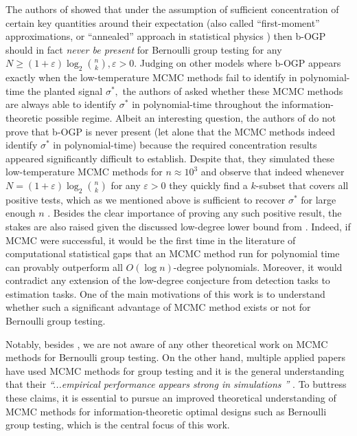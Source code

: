 \documentclass[12pt,reqno]{amsart}
\numberwithin{equation}{section}
\theoremstyle{definition}
\renewcommand{\epsilon}{\varepsilon}
\renewcommand{\[}{\begin{equation}}
\renewcommand{\]}{\end{equation}}
\renewcommand{\|}{\bigg{|}}
\begin{document}
The authors of \cite{iliopoulos2021group} showed that under the assumption of sufficient concentration of certain key quantities around their expectation (also called ``first-moment'' approximations, or ``annealed'' approach in statistical physics \cite{zdeborova2016statistical}) then b-OGP should in fact \emph{never be present} for Bernoulli group testing for any $N \geq (1+\epsilon)\log_2 \binom{n}{k}, \epsilon>0$. Judging on other models where b-OGP appears exactly when the low-temperature MCMC methods fail to identify in polynomial-time the planted signal $\sigma^*,$ the authors of \cite{iliopoulos2021group} asked whether these MCMC methods are always able to identify $\sigma^*$ in polynomial-time throughout the information-theoretic possible regime. Albeit an interesting question, the authors of \cite{iliopoulos2021group} do not prove that b-OGP is never present (let alone that the MCMC methods indeed identify $\sigma^*$ in polynomial-time) because the required concentration results appeared significantly difficult to establish. Despite that, they simulated these low-temperature MCMC methods for $n \approx 10^3$ and observe that indeed whenever $N= (1+\epsilon)\log_2 \binom{n}{k}$ for any $\epsilon>0$ they quickly find a $k$-subset that covers all positive tests, which as we mentioned above is sufficient to recover $\sigma^*$ for large enough $n$ \cite[Lemma 5]{iliopoulos2021group}. Besides the clear importance of proving any such positive result, the stakes are also raised given the discussed low-degree lower bound from \cite{cojaoghlan2022statistical}. Indeed, if MCMC were successful, it would be the first time in the literature of computational statistical gaps that an MCMC method run for polynomial time can provably outperform all $O(\log n)$-degree polynomials. Moreover, it would contradict any extension of the low-degree conjecture from detection tasks \cite{sam-thesis} to estimation tasks. One of the main motivations of this work is to understand whether such a significant advantage of MCMC method exists or not for Bernoulli group testing.

Notably, besides \cite{iliopoulos2021group}, we are not aware of any other theoretical work on MCMC methods for Bernoulli group testing. On the other hand, multiple applied papers have used MCMC methods for group testing \cite{schliep2003group,knill1996interpretation,furon2012decoding} and it is the general understanding that their \emph{``...empirical performance appears strong in simulations ''} \cite[Section 3.3.1]{Aldridge_2019}. To buttress these claims, it is essential to pursue an improved theoretical understanding of MCMC methods for information-theoretic optimal designs such as Bernoulli group testing, which is the central focus of this work.
\end{document}
